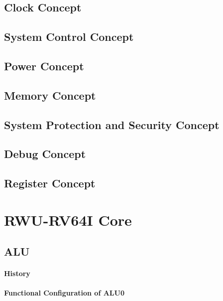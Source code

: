 \section{Clock Concept}


\section{System Control Concept}

\section{Power Concept}

\section{Memory Concept}


\section{System Protection and Security Concept}

\section{Debug Concept}

\section{Register Concept}


\chapter{RWU-RV64I Core}
\section{ALU}
\label{sec:alufunc01}
\subsubsection{History}


\subsubsection{Functional Configuration of ALU0}


